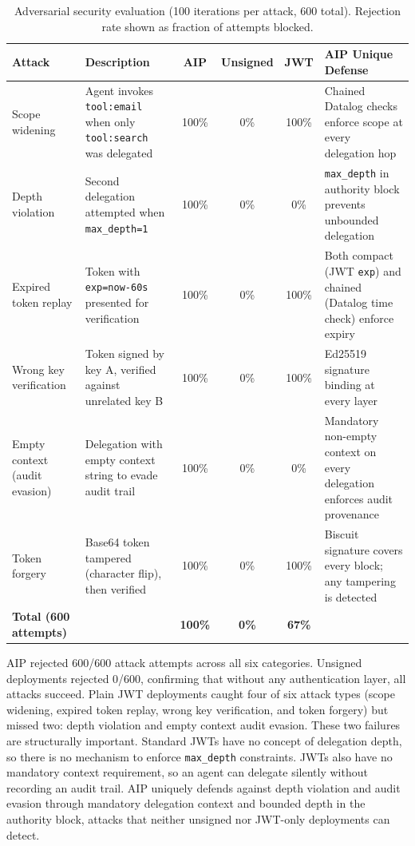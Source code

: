 \documentclass[11pt,a4paper]{article}
\newcommand{\aip}{\textsc{AIP}}
\begin{document}
\begin{table}[t]
\centering
\caption{Adversarial security evaluation (100 iterations per attack, 600 total). Rejection rate shown as fraction of attempts blocked.}
\label{tab:adversarial}
\footnotesize
\begin{tabular}{@{}p{3.2cm}p{5.5cm}cccp{3.8cm}@{}}
\toprule
\textbf{Attack} & \textbf{Description} & \textbf{AIP} & \textbf{Unsigned} & \textbf{JWT} & \textbf{AIP Unique Defense} \\
\midrule
Scope widening & Agent invokes \texttt{tool:email} when only \texttt{tool:search} was delegated & 100\% & 0\% & 100\% & Chained Datalog checks enforce scope at every delegation hop \\
\addlinespace
Depth violation & Second delegation attempted when \texttt{max\_depth=1} & 100\% & 0\% & 0\% & \texttt{max\_depth} in authority block prevents unbounded delegation \\
\addlinespace
Expired token replay & Token with \texttt{exp=now-60s} presented for verification & 100\% & 0\% & 100\% & Both compact (JWT \texttt{exp}) and chained (Datalog time check) enforce expiry \\
\addlinespace
Wrong key verification & Token signed by key A, verified against unrelated key B & 100\% & 0\% & 100\% & Ed25519 signature binding at every layer \\
\addlinespace
Empty context (audit evasion) & Delegation with empty context string to evade audit trail & 100\% & 0\% & 0\% & Mandatory non-empty context on every delegation enforces audit provenance \\
\addlinespace
Token forgery & Base64 token tampered (character flip), then verified & 100\% & 0\% & 100\% & Biscuit signature covers every block; any tampering is detected \\
\midrule
\textbf{Total (600 attempts)} & & \textbf{100\%} & \textbf{0\%} & \textbf{67\%} & \\
\bottomrule
\end{tabular}
\end{table}

\aip{} rejected 600/600 attack attempts across all six categories. Unsigned deployments rejected 0/600, confirming that without any authentication layer, all attacks succeed. Plain JWT deployments caught four of six attack types (scope widening, expired token replay, wrong key verification, and token forgery) but missed two: depth violation and empty context audit evasion. These two failures are structurally important. Standard JWTs have no concept of delegation depth, so there is no mechanism to enforce \texttt{max\_depth} constraints. JWTs also have no mandatory context requirement, so an agent can delegate silently without recording an audit trail. \aip{} uniquely defends against depth violation and audit evasion through mandatory delegation context and bounded depth in the authority block, attacks that neither unsigned nor JWT-only deployments can detect.
\end{document}
